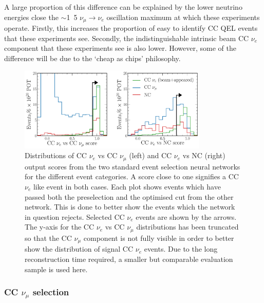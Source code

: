 A large proportion of this difference can be explained by the lower neutrino energies close the
$\sim$\unit{1.5}{\GeV} $\nu_{\mu}\rightarrow\nu_{e}$ oscillation maximum at which these
experiments operate. Firstly, this increases the proportion of easy to identify CC QEL events that
these experiments see. Secondly, the indistinguishable intrinsic beam CC $\nu_{e}$ component that
these experiments see is also lower. However, some of the difference will be due to the `cheap as
chips' philosophy.

\begin{figure} %
    \includegraphics[width=0.8\textwidth]{diagrams/7-results/final_old_pid_outputs.pdf}
    \caption[Distributions of standard event selectio neural network output scores]
    {Distributions of CC $\nu_{e}$ vs CC $\nu_{\mu}$ (left) and CC $\nu_{e}$ vs NC (right) output
        scores from the two standard event selection neural networks for the different event
        categories. A score close to one signifies a CC $\nu_{e}$ like event in both cases. Each
        plot shows events which have passed both the preselection and the optimised cut from the
        other network. This is done to better show the events which the network in question
        rejects. Selected CC $\nu_{e}$ events are shown by the arrows. The y-axis for the CC
        $\nu_{e}$ vs CC $\nu_{\mu}$ distributions has been truncated so that the CC $\nu_{\mu}$
        component is not fully visible in order to better show the distribution of signal CC
        $\nu_{e}$ events. Due to the long reconstruction time required, a smaller but comparable
        evaluation sample is used here.}
    \label{fig:final_old_pid_outputs}
\end{figure}

\subsubsection*{CC $\nu_{\mu}$ selection} %

